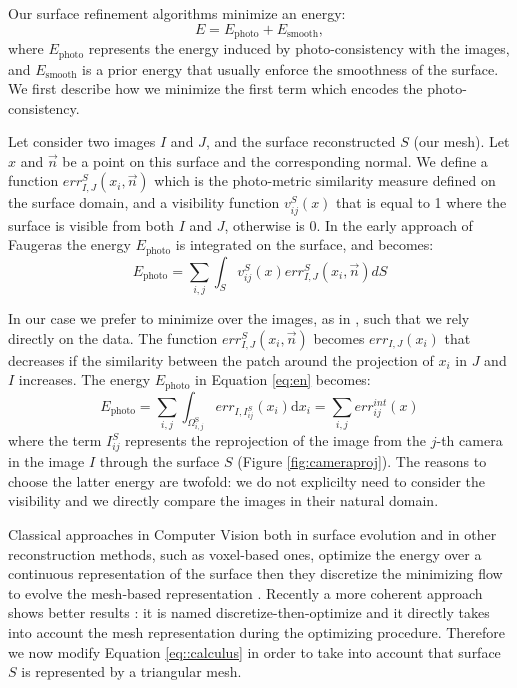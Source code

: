 Our surface refinement algorithms minimize an energy:
\begin{equation}
\label{eq:en}
E = E_{\textrm{photo}} + E_{\textrm{smooth}} ,
\end{equation}
where  $E_{\textrm{photo}}$ represents the energy induced by photo-consistency with the images, and $E_{\textrm{smooth}}$ is a prior energy that usually enforce the smoothness of the surface.  
We first describe how we minimize the first term which encodes the photo-consistency.

Let consider two images $I$ and $J$, and the surface reconstructed $\mathit{S}$ (our mesh). Let $x$ and $\overrightarrow{n}$ be a point on this surface and the corresponding normal. 
We define a function $err^S_{I, J}(x_i,\overrightarrow{n})$ which is the photo-metric similarity measure defined on the surface domain, and a visibility function $v^{\mathit{S}}_{ij}(x)$ that is equal to 1 where the surface is visible from both $I$ and $J$, otherwise is 0. 
In the early approach of Faugeras \etal \cite{faugeras2002variational} the energy $E_{\textrm{photo}}$ is integrated on the surface, and becomes:
\begin{equation}
 E_{\textrm{photo}} = \sum_{i,j}\int_{\mathit{S}} v^{\mathit{S}}_{ij}(x) err^S_{I,J}(x_i, \overrightarrow{n}) d\mathit{S}
\end{equation}


In our case we prefer to minimize  over the images, as in \cite{pons2007multi}, such that we rely directly on the data.
The function $err^S_{I, J}(x_i,\overrightarrow{n})$ becomes 
$err_{I, J}(x_i)$ that decreases if the similarity between the patch around the projection of $x_i$ in  $J$ and $I$ increases.
The energy $E_{\textrm{photo}}$ in Equation \eqref{eq:en} becomes:
\begin{equation}
\label{eq:energy_photo}
  E_{\textrm{photo}} = \sum_{i,j}\int_{\Omega^{\textrm{S}}_{i,j}} err_{I, I_{ij}^{\mathit{S}}}(x_i)\textrm{d}x_i = \sum_{i,j} \mathit{err}^{int}_{ij}(x)
\end{equation}
where the term $I_{ij}^{\mathit{S}}$ represents the reprojection of the image from the $j$-th camera in the image $I$ through the surface $\mathit{S}$
(Figure \ref{fig:cameraproj}).
The reasons to choose the latter energy are twofold: we do not explicilty need to consider the visibility and we directly compare the images in their natural domain.

Classical approaches in Computer Vision both in surface evolution and in other reconstruction methods, such as voxel-based ones, optimize the energy over a continuous representation of the surface then they discretize the minimizing flow to evolve the mesh-based representation \cite{pons2007multi,faugeras2002variational}. Recently a more coherent approach shows better results \cite{vu_et_al_2012,delaunoy_et_al_08}: it is named discretize-then-optimize and it directly takes into account the mesh representation during the optimizing procedure. 
Therefore we now modify Equation \eqref{eq::calculus} in order to take into account that  surface $\mathit{S}$ is represented by a triangular mesh.

